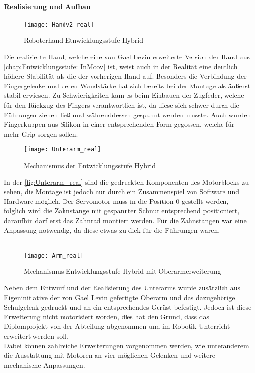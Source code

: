 \documentclass[titlepage,12pt,twoside]{article}
\begin{document}
\paragraph{Realisierung und Aufbau}
\hfill \break
\hfill \break
\begin{figure}[H]
	\begin{center}
		\scalebox{0.5}
		{\texttt{[image: Handv2\_real]}}
		\caption{Roboterhand Etnwicklungsstufe Hybrid}
		\label{fig:Handv2_real}			
	\end{center}
\end{figure}
\hfill \break
Die realisierte Hand, welche eine von Gael Levin erweiterte Version der Hand aus 
\autoref{chap:Entwicklungsstufe: InMoov} ist, weist auch in der Realität eine 
deutlich höhere Stabilität als die der vorherigen Hand auf. Besonders die 
Verbindung der Fingergelenke und deren Wandstärke hat sich bereits bei der Montage 
als äußerst stabil erwiesen. Zu Schwierigkeiten kam es beim Einbauen der Zugfeder, 
welche für den Rückzug des Fingers verantwortlich ist, da diese sich schwer durch 
die Führungen ziehen ließ und währenddessen gespannt werden musste. Auch wurden 
Fingerkuppen aus Silikon in einer entsprechenden Form gegossen, welche für mehr 
Grip sorgen sollen. \\
\begin{figure}[H]
	\begin{center}
		\scalebox{1}
		{\texttt{[image: Unterarm\_real]}}
		\caption{Mechanismus der Entwicklungsstufe Hybrid}
		\label{fig:Unterarm_real}			
	\end{center}
\end{figure}
\hfill \break
In der \autoref{fig:Unterarm_real} sind die gedruckten Komponenten des Motorblocks 
zu sehen, die Montage ist jedoch nur durch ein Zusammenspiel von Software und 
Hardware möglich. Der Servomotor muss in die Position 0 gestellt werden, folglich 
wird die Zahnstange mit gespannter Schnur entsprechend positioniert, daraufhin 
darf erst das Zahnrad montiert werden. Für die Zahnstangen war eine Anpassung 
notwendig, da diese etwas zu dick für die Führungen waren. \\
\\
\begin{figure}[H]
	\begin{center}
		\scalebox{1}
		{\texttt{[image: Arm\_real]}}
		\caption{Mechanismus Entwicklungsstufe Hybrid mit Oberarmerweiterung}
		\label{fig:Arm_real}			
	\end{center}
\end{figure}
\hfill \break
Neben dem Entwurf und der Realisierung des Unterarms wurde zusätzlich aus 
Eigeninitiative der von Gael Levin gefertigte Oberarm und das dazugehörige 
Schulgelenk gedruckt und an ein entsprechendes Gerüst befestigt. Jedoch ist diese 
Erweiterung nicht motorisiert worden, dies hat den Grund, dass das Diplomprojekt
von der Abteilung abgenommen und im Robotik-Unterricht erweitert werden soll. \\
Dabei können zahlreiche Erweiterungen vorgenommen werden, wie unteranderem die 
Ausstattung mit Motoren an vier möglichen Gelenken und weitere mechanische 
Anpassungen. \\
\end{document}
